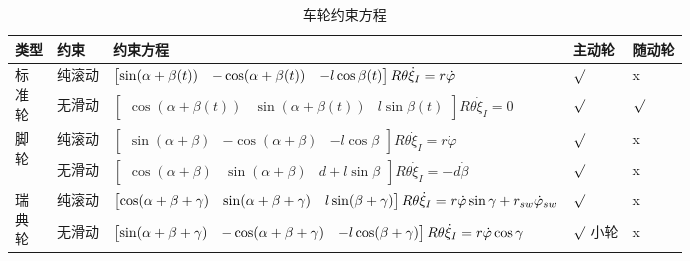 \documentclass[
12pt, %
a4paper, 
oneside, %
headinclude,footinclude, %
]{scrartcl}
\begin{document}
\begin{table}[H]
\centering
\begin{tabular}{|p{0.9cm}|p{1.3cm}|p{10cm}|p{1.4cm}|p{1.3cm}|}
\hline
类型 & 约束 & 约束方程 & 主动轮 & 随动轮 \\
\hline
\multirow{2}{*}{\parbox[c]{0.9cm}{标\\准\\轮}} & 纯滚动 & $ \begin{bmatrix} \sin(\alpha + \beta(t)) & -\cos(\alpha + \beta(t)) & -l \cos\beta(t) \end{bmatrix} R \theta \dot{\xi}_I \newline = r \dot{\varphi} $ & $ \surd $ & x \\
\cline{2-5}
& 无滑动 & $ \begin{bmatrix} \cos(\alpha + \beta(t)) & \sin(\alpha + \beta(t)) & l \sin\beta(t) \end{bmatrix} R \theta \dot{\xi}_I = 0 $ & $ \surd $ & $ \surd $ \\
\hline
\multirow{2}{*}{\parbox[c]{0.9cm}{脚\\轮}} & 纯滚动 & $ \begin{bmatrix} \sin(\alpha + \beta) & -\cos(\alpha + \beta) & -l \cos\beta \end{bmatrix} R \theta \dot{\xi}_I = r \dot{\varphi} $ & $ \surd $ & x \\
\cline{2-5}
& 无滑动 & $ \begin{bmatrix} \cos(\alpha + \beta) & \sin(\alpha + \beta) & d + l \sin\beta \end{bmatrix} R \theta \dot{\xi}_I = -d \dot{\beta} $ & $ \surd $ & x \\
\hline
\multirow{2}{*}{\parbox[c]{0.9cm}{瑞\\典\\轮}} & 纯滚动 & $ \begin{bmatrix} \cos(\alpha + \beta + \gamma) & \sin(\alpha + \beta + \gamma) & l \sin(\beta + \gamma) \end{bmatrix} R \theta \dot{\xi}_I \newline = r \dot{\varphi}\sin\gamma + r_{sw}\dot{\varphi}_{sw} $ & $ \surd $ & x \\
\cline{2-5}
& 无滑动 & $ \begin{bmatrix} \sin(\alpha + \beta + \gamma) & -\cos(\alpha + \beta + \gamma) & -l \cos(\beta + \gamma) \end{bmatrix} R \theta \dot{\xi}_I \newline = r \dot{\varphi} \cos\gamma $ & $ \surd $ \newline 小轮 & x \\
\hline
\end{tabular}
\caption{车轮约束方程}
\end{table}
\end{document}

